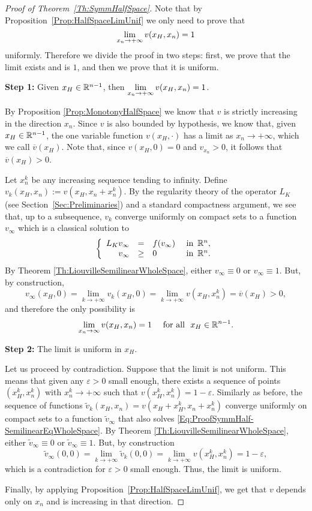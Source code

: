 \begin{proof}[Proof of Theorem~\ref{Th:SymmHalfSpace}]
Note that by Proposition~\ref{Prop:HalfSpaceLimUnif} we only need to prove that
$$
\displaystyle \lim_{x_n\to+ \infty} v(x_H,x_n) = 1
$$
uniformly. Therefore we divide the proof in two steps: first, we prove that the limit exists and is $1$, and then we prove that it is uniform.


\textbf{Step 1:} Given $x_H\in \mathbb{R}^{n-1}$, then  $\displaystyle \lim_{x_n\to +\infty} v(x_H,x_n) = 1$.

By Proposition \ref{Prop:MonotonyHalfSpace} we know that $v$ is strictly increasing in the direction $x_n$. Since $v$ is also bounded by hypothesis, we know that, given $x_H\in\mathbb{R}^{n-1}$, the one variable function $v(x_H,\cdot)$ has a limit as $x_n\to +\infty$, which we call $\overline{v}(x_H)$. Note that, since $v(x_H,0) = 0$ and $v_{x_n}>0$, it follows that $\overline{v}(x_H) > 0$.

Let $x_n^k$ be any increasing sequence tending to infinity. Define $v_k(x_H,x_n) := v(x_H,x_n+x_n^k)$. By the regularity theory of the operator $L_K $ (see Section~\ref{Sec:Preliminaries}) and a standard compactness argument, we see that, up to a subsequence, $v_k$ converge uniformly on compact sets to a function $v_\infty$ which is a classical solution to
\begin{equation}
\label{Eq:ProofSymmHalf-SemilinearEqWholeSpace}
\left\{\begin{array}{rcll}
L_K v_\infty &=& f(v_\infty)   &\textrm{ in } \,\mathbb{R}^n,\\
v_\infty &\geq& 0   &\textrm{ in } \,\mathbb{R}^n.
\end{array} \right.
\end{equation}
By Theorem \ref{Th:LiouvilleSemilinearWholeSpace}, either $v_\infty\equiv 0$ or $v_\infty \equiv 1$. But, by construction,
$$ v_\infty(x_H,0) = \lim_{k\to + \infty} v_k(x_H,0) = \lim_{k\to + \infty} v(x_H,x_n^k) = \overline{v}(x_H) > 0, $$
and therefore the only possibility is
$$ \lim_{x_n\to \infty} v(x_H,x_n) = 1 \quad \text{ for all } \ x_H\in\mathbb{R}^{n-1}. $$

\textbf{Step 2:} The limit is uniform in $x_H$.

Let us proceed by contradiction. Suppose that the limit is not uniform. This means that given any $\varepsilon>0$ small enough, there exists a sequence of points $(x_H^k,x_n^k)$ with $x_n^k\to +\infty$ such that $v(x_H^k,x_n^k) = 1-\varepsilon$. Similarly as before, the sequence of functions $\tilde{v}_k(x_H,x_n) = v(x_H+x_H^k,x_n+x_n^k)$ converge uniformly on compact sets to a function $\tilde{v}_\infty$ that also solves \eqref{Eq:ProofSymmHalf-SemilinearEqWholeSpace}. By Theorem \ref{Th:LiouvilleSemilinearWholeSpace}, either $\tilde{v}_\infty\equiv 0$ or $\tilde{v}_\infty \equiv 1$. But, by construction
$$ 
\tilde{v}_\infty(0,0) = \lim_{k\to +\infty} \tilde{v}_k(0,0) = \lim_{k\to +\infty} v(x_H^k,x_n^k) = 1-\varepsilon, 
$$
which is a contradiction for $\varepsilon>0$ small enough. Thus, the limit is uniform.

Finally, by applying Proposition~\ref{Prop:HalfSpaceLimUnif}, we get that $v$ depends only on $x_n$ and is increasing in that direction.
\end{proof}
